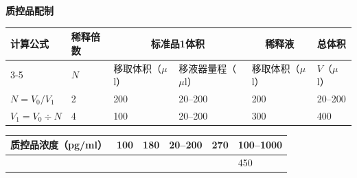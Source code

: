 \documentclass[UTF8,10pt,a4paper,fontset=fandol]{ctexart}
\newcommand{\fieldvalue}[1]{#1}
\newcommand{\handwritten}[1]{#1}
\begin{document}
\begin{center}
\vspace{2mm}

\textbf{质控品配制}

\begin{tabular}{|p{2.2cm}|p{1.0cm}|p{2.2cm}|p{2.2cm}|p{2.2cm}|p{1.5cm}|}
\hline
计算公式 & 稀释倍数 & \multicolumn{2}{c|}{标准品1体积} & \multicolumn{1}{c|}{稀释液} & 总体积\\
\cline{3-5}
& $N$ & 移取体积（$\mu$l） & 移液器量程（$\mu$l） & 移取体积（$\mu$l） & $V$（$\mu$l）\\
\hline
$N=V_0/V_1$ &
\fieldvalue{\handwritten{2}} &
\fieldvalue{\handwritten{200}} &
\fieldvalue{\handwritten{20--200}} &
\fieldvalue{\handwritten{200}} &
\fieldvalue{\handwritten{20--200}}\\
\hline
$V_1=V_0\div N$ &
\fieldvalue{\handwritten{4}} &
\fieldvalue{\handwritten{100}} &
\fieldvalue{\handwritten{20--200}} &
\fieldvalue{\handwritten{300}} &
\fieldvalue{\handwritten{400}}\\
\hline
\end{tabular}

\vspace{2mm}

\begin{tabular}{|p{2.2cm}|p{2.0cm}|p{2.2cm}|p{2.2cm}|p{2.2cm}|p{1.5cm}|}
\hline
质控品浓度（pg/ml） &
\fieldvalue{\handwritten{100}} &
\fieldvalue{\handwritten{180}} &
\fieldvalue{\handwritten{20--200}} &
\fieldvalue{\handwritten{270}} &
\fieldvalue{\handwritten{100--1000}}\\
\hline
\multicolumn{5}{|c|}{}
&
\fieldvalue{\handwritten{450}}\\
\hline
\end{tabular}
\end{center}
\end{document}
